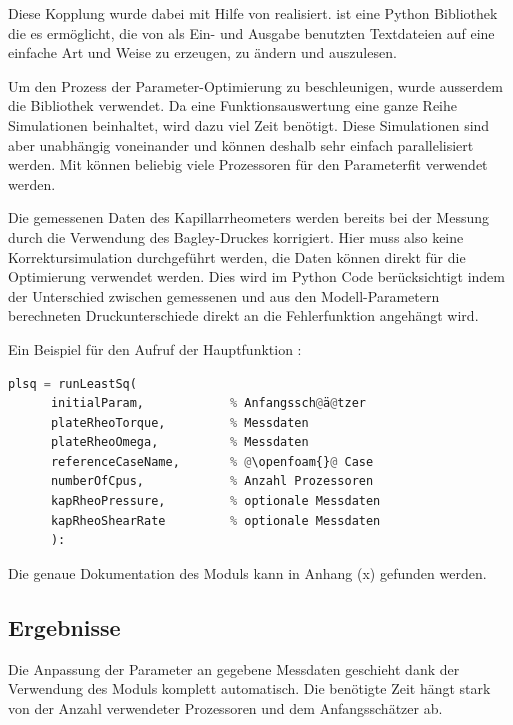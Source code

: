 Diese Kopplung wurde dabei mit Hilfe von   realisiert.  ist eine Python Bibliothek die es ermöglicht, die von \openfoam{} als Ein- und Ausgabe benutzten Textdateien auf eine einfache Art und Weise zu erzeugen, zu ändern und auszulesen.

Um den Prozess der Parameter-Optimierung zu beschleunigen, wurde ausserdem die Bibliothek   verwendet. Da eine Funktionsauswertung eine ganze Reihe Simulationen beinhaltet, wird dazu viel Zeit benötigt. Diese Simulationen sind aber unabhängig voneinander und können deshalb sehr einfach parallelisiert werden. Mit  können beliebig viele Prozessoren für den Parameterfit verwendet werden.

Die gemessenen Daten des Kapillarrheometers werden bereits bei der Messung durch die Verwendung des Bagley-Druckes korrigiert. Hier muss also keine Korrektursimulation durchgeführt werden, die Daten können direkt für die Optimierung verwendet werden. Dies wird im Python Code berücksichtigt indem der Unterschied zwischen gemessenen und aus den Modell-Parametern berechneten Druckunterschiede direkt an die Fehlerfunktion angehängt wird.

Ein Beispiel für den Aufruf der Hauptfunktion :
\begin{lstlisting}[language=Python]
plsq = runLeastSq(
      initialParam,            % Anfangssch@ä@tzer
      plateRheoTorque,         % Messdaten
      plateRheoOmega,          % Messdaten
      referenceCaseName,       % @\openfoam{}@ Case
      numberOfCpus,            % Anzahl Prozessoren
      kapRheoPressure,         % optionale Messdaten
      kapRheoShearRate         % optionale Messdaten
      ):  
\end{lstlisting}
%
Die genaue Dokumentation des Moduls kann in Anhang (x)  gefunden werden.
%
\subsection{Ergebnisse}
Die Anpassung der Parameter an gegebene Messdaten geschieht dank der Verwendung des  Moduls komplett automatisch. 
Die benötigte Zeit hängt stark von der Anzahl verwendeter Prozessoren und dem Anfangsschätzer ab.
%
